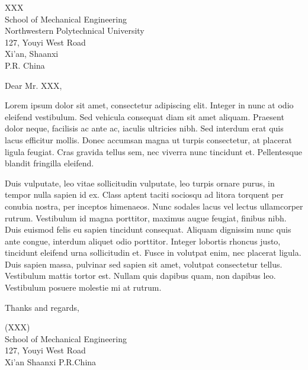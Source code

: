 \documentclass[12pt, a4paper]{letter} %
\begin{document}

\begin{letter}{
	XXX\\
	School of Mechanical Engineering\\
	Northwestern Polytechnical University\\
	127, Youyi West Road\\
	Xi'an, Shaanxi\\
	P.R. China\\
}



\opening{Dear Mr. XXX,}

Lorem ipsum dolor sit amet, consectetur adipiscing elit. Integer in nunc at odio eleifend vestibulum. Sed vehicula consequat diam sit amet aliquam. Praesent dolor neque, facilisis ac ante ac, iaculis ultricies nibh. Sed interdum erat quis lacus efficitur mollis. Donec accumsan magna ut turpis consectetur, at placerat ligula feugiat. Cras gravida tellus sem, nec viverra nunc tincidunt et. Pellentesque blandit fringilla eleifend.

Duis vulputate, leo vitae sollicitudin vulputate, leo turpis ornare purus, in tempor nulla sapien id ex. Class aptent taciti sociosqu ad litora torquent per conubia nostra, per inceptos himenaeos. Nunc sodales lacus vel lectus ullamcorper rutrum. Vestibulum id magna porttitor, maximus augue feugiat, finibus nibh. Duis euismod felis eu sapien tincidunt consequat. Aliquam dignissim nunc quis ante congue, interdum aliquet odio porttitor. Integer lobortis rhoncus justo, tincidunt eleifend urna sollicitudin et. Fusce in volutpat enim, nec placerat ligula. Duis sapien massa, pulvinar sed sapien sit amet, volutpat consectetur tellus. Vestibulum mattis tortor est. Nullam quis dapibus quam, non dapibus leo. Vestibulum posuere molestie mi at rutrum.

\closing{Thanks and regards,}

\signature{XXX}

\noindent
(XXX)\\
School of Mechanical Engineering\\ %
127, Youyi West Road\\ %
Xi'an Shaanxi P.R.China\\ %




\end{letter}
\end{document}
